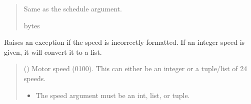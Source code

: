 \documentclass[letterpaper,10pt,english]{sphinxmanual}
\begin{document}
\begin{fulllineitems}
\begin{fulllineitems}
\begin{quote}
\begin{description}
\begin{itemize}
\end{itemize}

\sphinxAtStartPar
Same as the schedule argument.

\sphinxAtStartPar
bytes

\end{description}\end{quote}

\end{fulllineitems}


\begin{fulllineitems}
\label{\detokenize{Morelia.Devices:Morelia.Devices.PodDevice_8229.Pod8229._Validate_Speed}}
\pysigstartsignatures
{}
\pysigstopsignatures
\sphinxAtStartPar
Raises an exception if the speed is incorrectly formatted. If an integer speed         is given, it will convert it to a list.
\begin{quote}\begin{description}
\sphinxAtStartPar
{} (\sphinxstyleliteralemphasis{\sphinxupquote{ | }}\sphinxstyleliteralemphasis{\sphinxupquote{ | }}\sphinxstyleliteralemphasis{\sphinxupquote{{[}}}\sphinxstyleliteralemphasis{\sphinxupquote{{]}}}) \textendash{} Motor speed (0\sphinxhyphen{}100). This can either be an                 integer or a tuple/list of 24 speeds.

\begin{itemize}
\item {} 
\sphinxAtStartPar
{} \textendash{} The speed argument must be an int, list, or tuple.


\end{itemize}
\end{description}
\end{quote}
\end{fulllineitems}
\end{fulllineitems}
\end{document}
